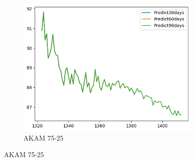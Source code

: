 \documentclass{ieeeojies}
\begin{document}
\begin{figure}[H]
\begin{subfigure}[b]{0.33\linewidth}
        \centering
        \includegraphics[width=\linewidth]{RNN Plot/RNN_AKAM_75_25_90.png}
        \caption{AKAM 75-25}
        \label{fig:akam-75-25}
    \end{subfigure}
\end{figure}
\vspace{-20pt}
\end{document}
